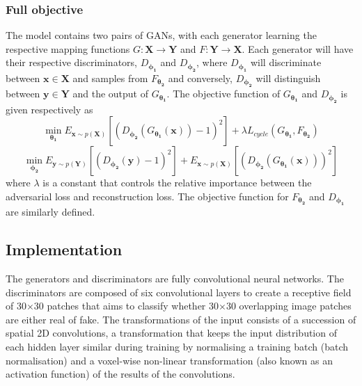 \subsubsection{Full objective}
The model contains two pairs of GANs, with each generator learning the respective mapping functions $G: \mathbf{X}\rightarrow \mathbf{Y}$ and $F: \mathbf{Y}\rightarrow \mathbf{X}$. Each generator will have their respective discriminators, $D_\mathbf{\phi_1}$ and $D_\mathbf{\phi_2}$, where $D_\mathbf{\phi_1}$ will discriminate between $\mathbf{x} \in \mathbf{X}$ and samples from $F_\mathbf{\theta_2}$ and conversely, $D_\mathbf{\phi_2}$ will distinguish between $\mathbf{y} \in \mathbf{Y}$ and the output of $G_\mathbf{\theta_1}$. The objective function of $G_\mathbf{\theta_1}$ and $D_\mathbf{\phi_2}$ is given respectively as
\begin{equation}
\label{eqn:full_eqn}
   \min_\mathbf{\theta_1} E_{\mathbf{x}\sim p(\mathbf{X})}[(D_\mathbf{\phi_2} (G_\mathbf{\theta_1}(\mathbf{x}))-1)^2] + \lambda L_{cycle}(G_\mathbf{\theta_1}, F_\mathbf{\theta_2})
\end{equation}
\begin{equation}
    \min_\mathbf{\phi_2} E_{\mathbf{y}\sim p(\mathbf{Y})}[(D_\mathbf{\phi_2} (\mathbf{y}) - 1)^2] + E_{\mathbf{x}\sim p(\mathbf{X})}[(D_\mathbf{\phi_2} (G_\mathbf{\theta_1}(\mathbf{x})))^2]
\end{equation}
where $\lambda$ is a constant that controls the relative importance between the adversarial loss and reconstruction loss.
The objective function for $F_\mathbf{\theta_2}$ and $D_\mathbf{\phi_1}$ are similarly defined.

\begin{comment}
\begin{figure}[htp]
\begin{center}
 \texttt{[image: cycle\_set.png]}
    \end{center}
  \caption{Generator A takes an image scan from scanner B and transforms that image into another, $\textbf{B}_\textbf{A}$, such that Discriminator A cannot distinguish it from an image from scanner A. Generator B then takes $\textbf{B}_\textbf{A}$ in order to reconstruct the original image. This process is mirrored for image scans from scanner A.}
  \label{fig:cycle_diagram}
\end{figure}
\end{comment}

\subsection{Implementation} \label{implementation}
The generators and discriminators are fully convolutional neural networks. The discriminators are composed of six convolutional layers to create a receptive field of 30$\times$30 patches that aims to classify whether 30$\times$30 overlapping image patches are either real of fake. The transformations of the input consists of a succession of spatial 2D convolutions, a transformation that keeps the input distribution of each hidden layer similar during training by normalising a training batch (batch normalisation) and a voxel-wise non-linear transformation (also known as an activation function) of the results of the convolutions.

